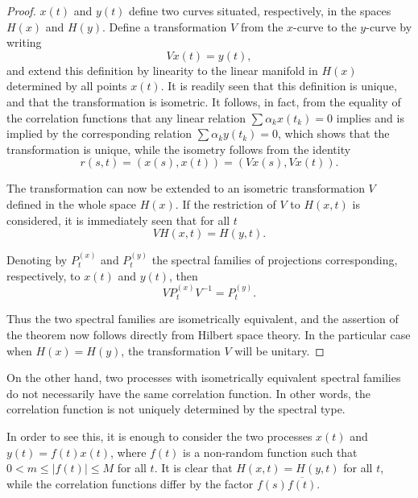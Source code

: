 \documentclass[11pt]{article}
\begin{document}
\begin{proof}
$x(t)$ and $y(t)$ define two curves situated, respectively, in the spaces $H(x)$ and $H(y)$. Define a transformation $V$ from the $x$-curve to the $y$-curve by writing
\begin{equation}
Vx(t) = y(t),
\label{eq:transformation}
\end{equation}
and extend this definition by linearity to the linear manifold in $H(x)$ determined by all points $x(t)$. It is readily seen that this definition is unique, and that the transformation is isometric. It follows, in fact, from the equality of the correlation functions that any linear relation $\sum \alpha_k x(t_k) = 0$ implies and is implied by the corresponding relation $\sum \alpha_k y(t_k) = 0$, which shows that the transformation is unique, while the isometry follows from the identity
\begin{equation}
r(s, t) = (x(s), x(t)) = (Vx(s), Vx(t)).
\label{eq:isometry}
\end{equation}

The transformation can now be extended to an isometric transformation $V$ defined in the whole space $H(x)$. If the restriction of $V$ to $H(x, t)$ is considered, it is immediately seen that for all $t$
\begin{equation}
VH(x, t) = H(y, t).
\label{eq:subspace_mapping}
\end{equation}

Denoting by $P_t^{(x)}$ and $P_t^{(y)}$ the spectral families of projections corresponding, respectively, to $x(t)$ and $y(t)$, then
\begin{equation}
VP_t^{(x)}V^{-1} = P_t^{(y)}.
\label{eq:spectral_equivalence}
\end{equation}

Thus the two spectral families are isometrically equivalent, and the assertion of the theorem now follows directly from Hilbert space theory. In the particular case when $H(x) = H(y)$, the transformation $V$ will be unitary.
\end{proof}

On the other hand, two processes with isometrically equivalent spectral families do not necessarily have the same correlation function. In other words, the correlation function is not uniquely determined by the spectral type.

In order to see this, it is enough to consider the two processes $x(t)$ and $y(t) = f(t)x(t)$, where $f(t)$ is a non-random function such that $0 < m \leq |f(t)| \leq M$ for all $t$. It is clear that $H(x, t) = H(y, t)$ for all $t$, while the correlation functions differ by the factor $f(s)\overline{f(t)}$.
\end{document}
